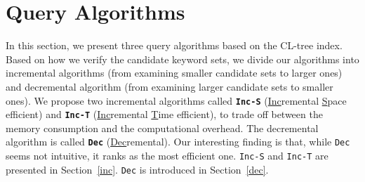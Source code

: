 \section{Query Algorithms}
\label{query}

In this section, we present three query algorithms based on the CL-tree index.
Based on how we verify the candidate keyword sets, we divide our algorithms into incremental algorithms (from examining smaller candidate sets to larger ones) and decremental algorithm (from examining larger candidate sets to smaller ones).
We propose two incremental algorithms called \textbf{{\tt Inc-S}} (\underline{Inc}remental \underline{S}pace efficient) and \textbf{{\tt Inc-T}} (\underline{Inc}remental \underline{T}ime efficient), to trade off between the memory consumption and the computational overhead.
The decremental algorithm is called \textbf{{\tt Dec}} (\underline{Dec}remental).
Our interesting finding is that, while {\tt Dec} seems not intuitive, it ranks as the most efficient one.
{\tt Inc-S} and {\tt Inc-T} are presented in Section~\ref{inc}.
{\tt Dec} is introduced in Section~\ref{dec}.


 